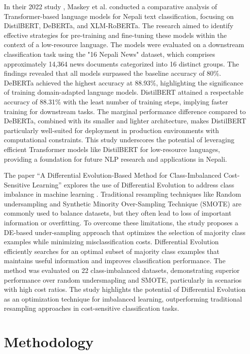 In their 2022 study \cite{distil}, Maskey et al. conducted a comparative analysis of Transformer-based language models for Nepali text classification, focusing on DistilBERT, DeBERTa, and XLM-RoBERTa. The research aimed to identify effective strategies for pre-training and fine-tuning these models within the context of a low-resource language. The models were evaluated on a downstream classification task using the "16 Nepali News" dataset, which comprises approximately 14,364 news documents categorized into 16 distinct groups.
The findings revealed that all models surpassed the baseline accuracy of 80\%. DeBERTa achieved the highest accuracy at 88.93\%, highlighting the significance of training domain-adapted language models. DistilBERT attained a respectable accuracy of 88.31\% with the least number of training steps, implying faster training for downstream tasks. The marginal performance difference compared to DeBERTa, combined with its smaller and lighter architecture, makes DistilBERT particularly well-suited for deployment in production environments with computational constraints. This study underscores the potential of leveraging efficient Transformer models like DistilBERT for low-resource languages, providing a foundation for future NLP research and applications in Nepali.

The paper “A Differential Evolution-Based Method for Class-Imbalanced Cost-Sensitive Learning” explores the use of Differential Evolution to address class imbalance in machine learning \cite{devo}. Traditional resampling techniques like Random undersampling and Synthetic Minority Over-Sampling Technique (SMOTE) are commonly used to balance datasets, but they often lead to loss of important information or overfitting. To overcome these limitations, the study proposes a DE-based under-sampling approach that optimizes the selection of majority class examples while minimizing misclassification costs.
Differential Evolution efficiently searches for an optimal subset of majority class examples that maintains useful information and improves classification performance. The method was evaluated on 22 class-imbalanced datasets, demonstrating superior performance over random undersmapling and SMOTE, particularly in scenarios with high cost ratios. The study highlights the potential of Differential Evolution as an optimization technique for imbalanced learning, outperforming traditional resampling approaches in cost-sensitive classification tasks.

\chapter{Methodology}

